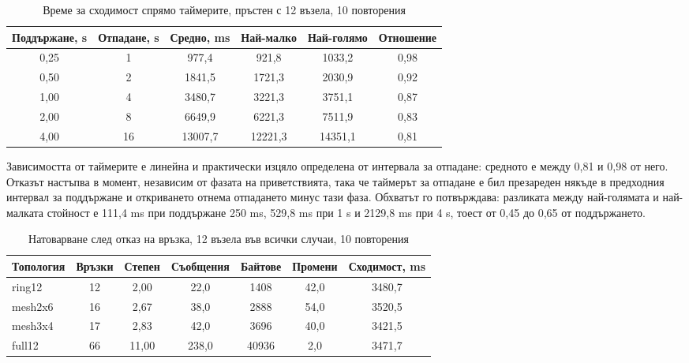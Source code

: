 \begin{table}[!htb]
\caption{Време за сходимост спрямо таймерите, пръстен с 12 възела, 10 повторения}
\label{tab:timers}
\centering
\fontsize{10}{12}\selectfont
\begin{spacing}{1.0}
\begin{tabular}{cccccc}
\toprule
Поддържане, s & Отпадане, s & Средно, ms & Най-малко & Най-голямо & Отношение \\
\midrule
0,25 & 1  & 977,4    & 921,8    & 1033,2   & 0,98 \\
0,50 & 2  & 1841,5   & 1721,3   & 2030,9   & 0,92 \\
1,00 & 4  & 3480,7   & 3221,3   & 3751,1   & 0,87 \\
2,00 & 8  & 6649,9   & 6221,3   & 7511,9   & 0,83 \\
4,00 & 16 & 13007,7  & 12221,3  & 14351,1  & 0,81 \\
\bottomrule
\end{tabular}
\end{spacing}
\end{table}

Зависимостта от таймерите  е линейна и практически изцяло определена от
интервала за отпадане: средното е между 0,81 и 0,98 от него. Отказът настъпва в момент,
независим от фазата на приветствията, така че таймерът за отпадане е бил презареден някъде в
предходния интервал за поддържане и откриването отнема отпадането минус тази фаза. Обхватът го
потвърждава: разликата между най-голямата и най-малката стойност е 111,4 ms при поддържане
250 ms, 529,8 ms при 1 s и 2129,8 ms при 4 s, тоест от 0,45 до 0,65 от поддържането.

\begin{table}[!htb]
\caption{Натоварване след отказ на връзка, 12 възела във всички случаи, 10 повторения}
\label{tab:flooding}
\centering
\fontsize{10}{12}\selectfont
\begin{spacing}{1.0}
\begin{tabular}{lcccccc}
\toprule
Топология & Връзки & Степен & Съобщения & Байтове & Промени & Сходимост, ms \\
\midrule
ring12   & 12 & 2,00  & 22,0  & 1408  & 42,0 & 3480,7 \\
mesh2x6  & 16 & 2,67  & 38,0  & 2888  & 54,0 & 3520,5 \\
mesh3x4  & 17 & 2,83  & 42,0  & 3696  & 40,0 & 3421,5 \\
full12   & 66 & 11,00 & 238,0 & 40936 &  2,0 & 3471,7 \\
\bottomrule
\end{tabular}
\end{spacing}
\end{table}

